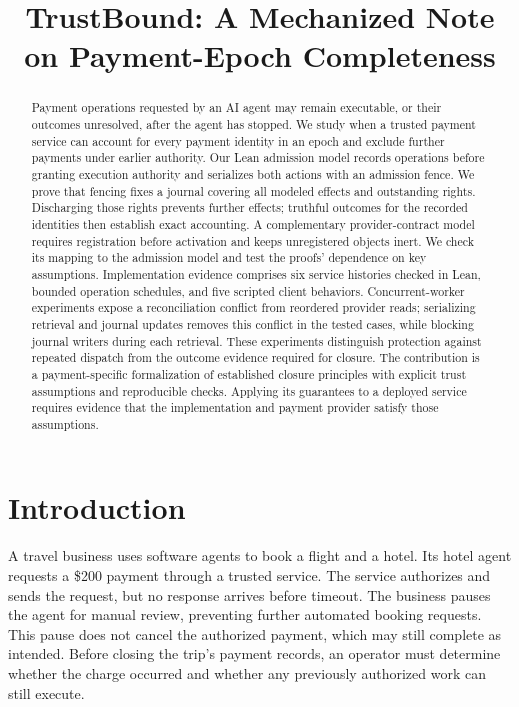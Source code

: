 \documentclass[11pt]{article}
\title{TrustBound: A Mechanized Note\\on Payment-Epoch Completeness}
\begin{document}
\maketitle
\begin{abstract}
Payment operations requested by an AI agent may remain executable, or their
outcomes unresolved, after the agent has stopped. We study when a trusted
payment service can account for every payment identity in an epoch and
exclude further payments under earlier authority. Our Lean admission model
records operations before granting execution authority and serializes both
actions with an admission fence. We prove that fencing fixes a journal
covering all modeled effects and outstanding rights. Discharging those rights
prevents further effects; truthful outcomes for the recorded identities then
establish exact accounting. A complementary provider-contract model requires
registration before activation and keeps unregistered objects inert. We check
its mapping to the admission model and test the proofs' dependence on key
assumptions. Implementation evidence comprises six service histories checked
in Lean, bounded operation schedules, and five scripted client behaviors.
Concurrent-worker experiments expose a reconciliation conflict from reordered
provider reads; serializing retrieval and journal updates removes this conflict
in the tested cases, while blocking journal writers during each retrieval.
These experiments distinguish protection against repeated dispatch from the
outcome evidence required for closure. The contribution is a payment-specific
formalization of established closure principles with explicit trust
assumptions and reproducible checks. Applying its guarantees to a deployed
service requires evidence that the implementation and payment provider
satisfy those assumptions.
\end{abstract}

\section{Introduction}
A travel business uses software agents to book a flight and a hotel. Its hotel
agent requests a \$200 payment through a trusted service. The service authorizes
and sends the request, but no response arrives before timeout. The business
pauses the agent for manual review, preventing further automated booking
requests. This pause does not cancel the authorized payment, which may still
complete as intended. Before closing the trip's payment records, an operator
must determine whether the charge occurred and whether any previously
authorized work can still execute.
\end{document}
